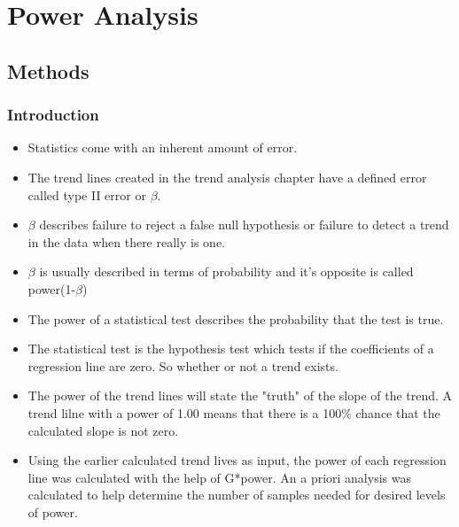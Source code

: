 \chapter{Power Analysis} \label{ch:poweranslysis}
\section{Methods}
\subsection{Introduction}
\begin{itemize}
	\item Statistics come with an inherent amount of error.
	\item The trend lines created in the trend analysis chapter have a defined error called type II error or $\beta$.
	\item $\beta$ describes failure to reject a false null hypothesis or failure to detect a trend in the data when there really is one.
	\item $\beta$ is usually described in terms of probability and it's opposite is called power(1-$\beta$)
	\item The power of a statistical test describes the probability that the test is true.
	\item The statistical test is the hypothesis test which tests if the coefficients of a regression line are zero.  So whether or not a trend exists.
	\item The power of the trend lines will state the "truth" of the slope of the trend.  A trend lilne with a power of 1.00 means that there is a 100$\%$ chance that the calculated slope is not zero.
	\item Using the earlier calculated trend lives as input, the power of each regression line was calculated with the help of G*power.  An a priori analysis was calculated to help determine the number of samples needed for desired levels of power.
\end{itemize}
